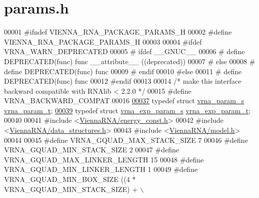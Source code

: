 \hypertarget{params_8h_source}{}\section{params.\+h}
\label{params_8h_source}

\begin{DoxyCode}
00001 \textcolor{preprocessor}{#ifndef VIENNA\_RNA\_PACKAGE\_PARAMS\_H}
00002 \textcolor{preprocessor}{#define VIENNA\_RNA\_PACKAGE\_PARAMS\_H}
00003 
00004 \textcolor{preprocessor}{#ifdef VRNA\_WARN\_DEPRECATED}
00005 \textcolor{preprocessor}{# ifdef \_\_GNUC\_\_}
00006 \textcolor{preprocessor}{#  define DEPRECATED(func) func \_\_attribute\_\_ ((deprecated))}
00007 \textcolor{preprocessor}{# else}
00008 \textcolor{preprocessor}{#  define DEPRECATED(func) func}
00009 \textcolor{preprocessor}{# endif}
00010 \textcolor{preprocessor}{#else}
00011 \textcolor{preprocessor}{# define DEPRECATED(func) func}
00012 \textcolor{preprocessor}{#endif}
00013 
00014 \textcolor{comment}{/* make this interface backward compatible with RNAlib < 2.2.0 */}
00015 \textcolor{preprocessor}{#define VRNA\_BACKWARD\_COMPAT}
00016 
\hyperlink{group__energy__parameters_ga8a69ca7d787e4fd6079914f5343a1f35}{00037} \textcolor{keyword}{typedef} \textcolor{keyword}{struct  }\hyperlink{group__energy__parameters_structvrna__param__s}{vrna\_param\_s} \hyperlink{group__energy__parameters_structvrna__param__s}{vrna\_param\_t};
\hyperlink{group__energy__parameters_ga01d8b92fe734df8d79a6169482c7d8d8}{00039} \textcolor{keyword}{typedef} \textcolor{keyword}{struct  }\hyperlink{group__energy__parameters_structvrna__exp__param__s}{vrna\_exp\_param\_s} \hyperlink{group__energy__parameters_structvrna__exp__param__s}{vrna\_exp\_param\_t};
00040 
00041 \textcolor{preprocessor}{#include <\hyperlink{energy__const_8h}{ViennaRNA/energy\_const.h}>}
00042 \textcolor{preprocessor}{#include <\hyperlink{data__structures_8h}{ViennaRNA/data\_structures.h}>}
00043 \textcolor{preprocessor}{#include <\hyperlink{model_8h}{ViennaRNA/model.h}>}
00044 
00045 \textcolor{preprocessor}{#define   VRNA\_GQUAD\_MAX\_STACK\_SIZE     7}
00046 \textcolor{preprocessor}{#define   VRNA\_GQUAD\_MIN\_STACK\_SIZE     2}
00047 \textcolor{preprocessor}{#define   VRNA\_GQUAD\_MAX\_LINKER\_LENGTH  15}
00048 \textcolor{preprocessor}{#define   VRNA\_GQUAD\_MIN\_LINKER\_LENGTH  1}
00049 \textcolor{preprocessor}{#define   VRNA\_GQUAD\_MIN\_BOX\_SIZE       ((4 * VRNA\_GQUAD\_MIN\_STACK\_SIZE) + \(\backslash\)}

\end{DoxyCode}
